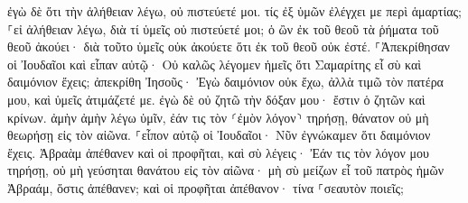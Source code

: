 \documentclass{openreader}
\begin{document}
ἐγὼ δὲ ὅτι τὴν ἀλήθειαν λέγω, οὐ πιστεύετέ μοι. 
τίς ἐξ ὑμῶν ἐλέγχει με περὶ ἁμαρτίας; ⸀εἰ ἀλήθειαν λέγω, διὰ τί ὑμεῖς οὐ πιστεύετέ μοι; 
ὁ ὢν ἐκ τοῦ θεοῦ τὰ ῥήματα τοῦ θεοῦ ἀκούει· διὰ τοῦτο ὑμεῖς οὐκ ἀκούετε ὅτι ἐκ τοῦ θεοῦ οὐκ ἐστέ. 
⸀Ἀπεκρίθησαν οἱ Ἰουδαῖοι καὶ εἶπαν αὐτῷ· Οὐ καλῶς λέγομεν ἡμεῖς ὅτι Σαμαρίτης εἶ σὺ καὶ δαιμόνιον ἔχεις; 
ἀπεκρίθη Ἰησοῦς· Ἐγὼ δαιμόνιον οὐκ ἔχω, ἀλλὰ τιμῶ τὸν πατέρα μου, καὶ ὑμεῖς ἀτιμάζετέ με. 
ἐγὼ δὲ οὐ ζητῶ τὴν δόξαν μου· ἔστιν ὁ ζητῶν καὶ κρίνων. 
ἀμὴν ἀμὴν λέγω ὑμῖν, ἐάν τις τὸν ⸂ἐμὸν λόγον⸃ τηρήσῃ, θάνατον οὐ μὴ θεωρήσῃ εἰς τὸν αἰῶνα. 
⸀εἶπον αὐτῷ οἱ Ἰουδαῖοι· Νῦν ἐγνώκαμεν ὅτι δαιμόνιον ἔχεις. Ἀβραὰμ ἀπέθανεν καὶ οἱ προφῆται, καὶ σὺ λέγεις· Ἐάν τις τὸν λόγον μου τηρήσῃ, οὐ μὴ γεύσηται θανάτου εἰς τὸν αἰῶνα· 
μὴ σὺ μείζων εἶ τοῦ πατρὸς ἡμῶν Ἀβραάμ, ὅστις ἀπέθανεν; καὶ οἱ προφῆται ἀπέθανον· τίνα ⸀σεαυτὸν ποιεῖς; 
\end{document}
